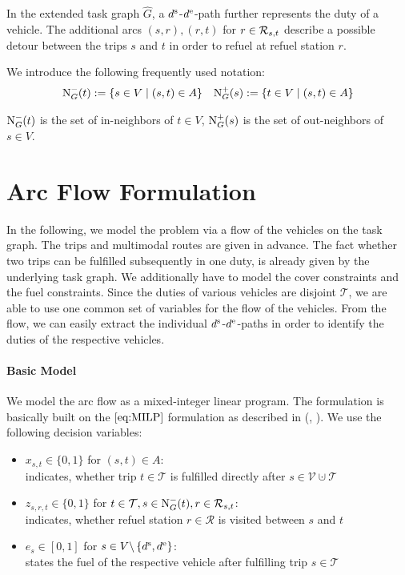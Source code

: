 In the extended task graph $\widehat{G}$, a $d^{\operatorname{s}}$-$d^{\operatorname{e}}$-path further represents the duty of a vehicle. The additional arcs $(s,r),(r,t)$ for $r\in\mathcal{R}_{s,t}$ describe a possible detour between the trips $s$ and $t$ in order to refuel at refuel station $r$.

We introduce the following frequently used notation:
\begin{align*}
	\operatorname{N}_G^-(t) := \left\{s\in V\mid (s,t)\in A\right\} && \operatorname{N}_G^+(s) := \left\{t\in V\mid (s,t)\in A\right\}
\end{align*}

$\operatorname{N}_G^-(t)$ is the set of in-neighbors of $t\in V$, $\operatorname{N}_G^+(s)$ is the set of out-neighbors of $s\in V$.


\section{Arc Flow Formulation}
\label{sec:arcflow_formulation}

In the following, we model the problem via a flow of the vehicles on the task graph. The trips and multimodal routes are given in advance. The fact whether two trips can be fulfilled subsequently in one duty, is already given by the underlying task graph. We additionally have to model the cover constraints and the fuel constraints. Since the duties of various vehicles are disjoint \wrt $\mathcal{T}$, we are able to use one common set of variables for the flow of the vehicles. From the flow, we can easily extract the individual $d^{\operatorname{s}}$-$d^{\operatorname{e}}$-paths in order to identify the duties of the respective vehicles.

\paragraph{Basic Model} \parfill

We model the arc flow as a mixed-integer linear program. The formulation is basically built on the $\eqref{eq:MILP}$ formulation as described in (\cite[p.~34]{Kaiser}, \cite[p.~34]{Knoll}). We use the following decision variables:
\begin{itemize}
	\item{$x_{s,t}\in\{0,1\}$ for $(s,t)\in A$:} \\
	indicates, whether trip $t\in\mathcal{T}$ is fulfilled directly after ${s\in \mathcal{V}\cupdot\mathcal{T}}$
	\item{$z_{s,r,t}\in\{0,1\}$ for $t\in\mathcal{T},s\in\operatorname{N}_G^-(t),r\in\mathcal{R}_{s,t}$:} \\
	indicates, whether refuel station $r\in\mathcal{R}$ is visited between $s$ and $t$
	\item{$e_s\in[0,1]$ for $s\in V\backslash\left\{d^{\operatorname{s}},d^{\operatorname{e}}\right\}$:} \\
	states the fuel of the respective vehicle after fulfilling trip $s\in\mathcal{T}$
\end{itemize}

